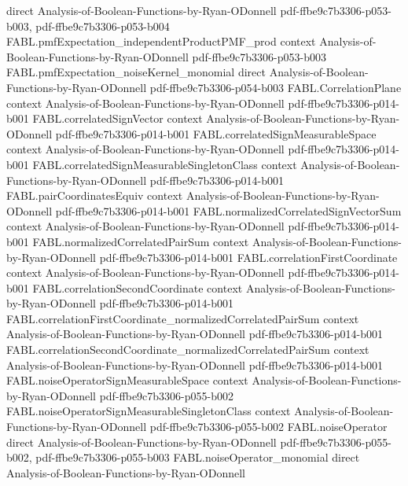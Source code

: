 \begin{theorem}
  {direct}
  {Analysis-of-Boolean-Functions-by-Ryan-ODonnell}
  {pdf-ffbe9c7b3306-p053-b003,
    pdf-ffbe9c7b3306-p053-b004}
\proofstep
  {FABL.pmfExpectation_independentProductPMF_prod}
  {context}
  {Analysis-of-Boolean-Functions-by-Ryan-ODonnell}
  {pdf-ffbe9c7b3306-p053-b003}
\proofstep
  {FABL.pmfExpectation_noiseKernel_monomial}
  {direct}
  {Analysis-of-Boolean-Functions-by-Ryan-ODonnell}
  {pdf-ffbe9c7b3306-p054-b003}
\proofstep
  {FABL.CorrelationPlane}
  {context}
  {Analysis-of-Boolean-Functions-by-Ryan-ODonnell}
  {pdf-ffbe9c7b3306-p014-b001}
\proofstep
  {FABL.correlatedSignVector}
  {context}
  {Analysis-of-Boolean-Functions-by-Ryan-ODonnell}
  {pdf-ffbe9c7b3306-p014-b001}
\proofstep
  {FABL.correlatedSignMeasurableSpace}
  {context}
  {Analysis-of-Boolean-Functions-by-Ryan-ODonnell}
  {pdf-ffbe9c7b3306-p014-b001}
\proofstep
  {FABL.correlatedSignMeasurableSingletonClass}
  {context}
  {Analysis-of-Boolean-Functions-by-Ryan-ODonnell}
  {pdf-ffbe9c7b3306-p014-b001}
\proofstep
  {FABL.pairCoordinatesEquiv}
  {context}
  {Analysis-of-Boolean-Functions-by-Ryan-ODonnell}
  {pdf-ffbe9c7b3306-p014-b001}
\proofstep
  {FABL.normalizedCorrelatedSignVectorSum}
  {context}
  {Analysis-of-Boolean-Functions-by-Ryan-ODonnell}
  {pdf-ffbe9c7b3306-p014-b001}
\proofstep
  {FABL.normalizedCorrelatedPairSum}
  {context}
  {Analysis-of-Boolean-Functions-by-Ryan-ODonnell}
  {pdf-ffbe9c7b3306-p014-b001}
\proofstep
  {FABL.correlationFirstCoordinate}
  {context}
  {Analysis-of-Boolean-Functions-by-Ryan-ODonnell}
  {pdf-ffbe9c7b3306-p014-b001}
\proofstep
  {FABL.correlationSecondCoordinate}
  {context}
  {Analysis-of-Boolean-Functions-by-Ryan-ODonnell}
  {pdf-ffbe9c7b3306-p014-b001}
\proofstep
  {FABL.correlationFirstCoordinate_normalizedCorrelatedPairSum}
  {context}
  {Analysis-of-Boolean-Functions-by-Ryan-ODonnell}
  {pdf-ffbe9c7b3306-p014-b001}
\proofstep
  {FABL.correlationSecondCoordinate_normalizedCorrelatedPairSum}
  {context}
  {Analysis-of-Boolean-Functions-by-Ryan-ODonnell}
  {pdf-ffbe9c7b3306-p014-b001}
\proofstep
  {FABL.noiseOperatorSignMeasurableSpace}
  {context}
  {Analysis-of-Boolean-Functions-by-Ryan-ODonnell}
  {pdf-ffbe9c7b3306-p055-b002}
\proofstep
  {FABL.noiseOperatorSignMeasurableSingletonClass}
  {context}
  {Analysis-of-Boolean-Functions-by-Ryan-ODonnell}
  {pdf-ffbe9c7b3306-p055-b002}
\proofstep
  {FABL.noiseOperator}
  {direct}
  {Analysis-of-Boolean-Functions-by-Ryan-ODonnell}
  {pdf-ffbe9c7b3306-p055-b002,
    pdf-ffbe9c7b3306-p055-b003}
\proofstep
  {FABL.noiseOperator_monomial}
  {direct}
  {Analysis-of-Boolean-Functions-by-Ryan-ODonnell}

\end{theorem}
